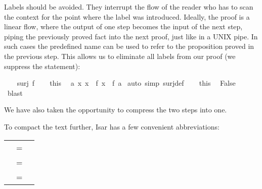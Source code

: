 \begin{isabellebody}
\begin{isamarkuptext}
Labels should be avoided. They interrupt the flow of the reader who has to
scan the context for the point where the label was introduced. Ideally, the
proof is a linear flow, where the output of one step becomes the input of the
next step, piping the previously proved fact into the next proof, just like
in a UNIX pipe. In such cases the predefined name  can be used
to refer to the proposition proved in the previous step. This allows us to
eliminate all labels from our proof (we suppress the  statement):%
\end{isamarkuptext}%
\isamarkuptrue%
%
\isadelimproof
%
\endisadelimproof
%
\isatagproof
{}\isamarkupfalse%
\isanewline
\ \ \isamarkupfalse%
\ {}surj\ f{}\isanewline
\ \ \isamarkupfalse%
\ this\ \isamarkupfalse%
\ {}{}a{}\ {}x{}\ x\ {}\ f\ x{}\ {}\ f\ a{}\ \isamarkupfalse%
{}auto\ simp{}\ surj{}def{}\isanewline
\ \ \isamarkupfalse%
\ this\ \isamarkupfalse%
\ {}False{}\ \isamarkupfalse%
\ blast\isanewline
{}\isamarkupfalse%
%
\endisatagproof
{\isafoldproof}%
%
\isadelimproof
%
\endisadelimproof
%
\begin{isamarkuptext}%
We have also taken the opportunity to compress the two 
steps into one.

To compact the text further, Isar has a few convenient abbreviations:
\medskip

\begin{tabular}{rcl}
\isacom{then} &=& \isacom{from} \isa{this}\\
\isacom{thus} &=& \isacom{then} \isacom{show}\\
\isacom{hence} &=& \isacom{then} \isacom{have}
\end{tabular}
\medskip


\end{isamarkuptext}
\end{isabellebody}
